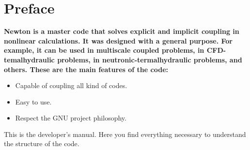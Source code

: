 \chapter*{Preface}

\par
\bf{Newton} is a master code that solves explicit and implicit coupling in nonlinear calculations. It was designed with a general purpose. 
For example, it can be used in multiscale coupled problems, in CFD-temalhydraulic problems, in neutronic-termalhydraulic problems, and others.
These are the main features of the code:
\begin{itemize} 
 \item Capable of coupling all kind of codes.
 \item Easy to use.
 \item Respect the GNU project philosophy.
\end{itemize}
This is the developer's manual. Here you find everything necessary to understand the structure of the code.



